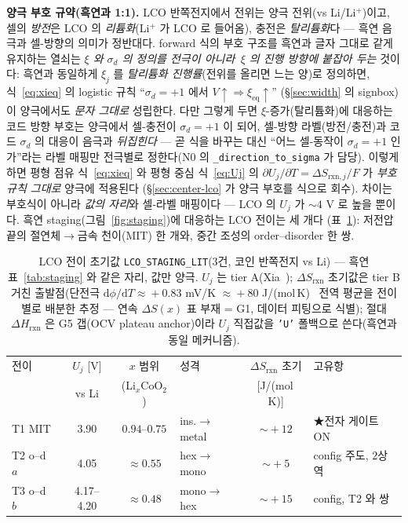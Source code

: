 \documentclass[11pt,a4paper]{article}
\newcommand{\dd}{\mathrm{d}}
\newcommand{\eq}{\mathrm{eq}}
\newcommand{\rxn}{\mathrm{rxn}}
\newcommand{\code}[1]{\texttt{#1}}
\begin{document}
\textbf{양극 부호 규약(흑연과 1:1).} LCO 반쪽전지에서 전위는 양극 전위(vs Li/Li$^+$)이고, 셀의 \emph{방전}은
LCO 의 \emph{리튬화}(Li$^+$ 가 LCO 로 들어옴), 충전은 \emph{탈리튬화}다 — 흑연 음극과 셀-방향의 의미가 정반대다.
forward 식의 부호 구조를 흑연과 글자 그대로 같게 유지하는 열쇠는 \emph{$\xi$ 와 $\sigma_d$ 의 정의를 전극이 아니라
\,$\xi$ 의 진행 방향에 붙잡아 두는} 것이다: 흑연과 동일하게 $\xi_j$ 를 \emph{탈리튬화 진행률}(전위를 올리면 느는 양)로
정의하면, 식~\eqref{eq:xieq} 의 logistic 규칙 ``$\sigma_d=+1$ 에서 $V\!\uparrow\Rightarrow\xi_\eq\!\uparrow$''
(\S\ref{sec:width} 의 signbox)이 양극에서도 \emph{문자 그대로} 성립한다. 다만 그렇게 두면 $\xi$-증가(탈리튬화)에
대응하는 코드 방향 부호는 양극에서 셀-충전이 $\sigma_d=+1$ 이 되어, 셀-방향 라벨(방전/충전)과 코드 $\sigma_d$ 의
대응이 음극과 \emph{뒤집힌다} — 곧 식을 바꾸는 대신 ``어느 셀-동작이 $\sigma_d=+1$ 인가''라는 라벨 매핑만 전극별로
정한다(N0 의 \code{\_direction\_to\_sigma} 가 담당). 이렇게 하면 평형 점유 식~\eqref{eq:xieq} 와 평형 중심
식~\eqref{eq:Uj} 의 $\partial U_j/\partial T=\Delta S_{\rxn,j}/F$ 가 \emph{부호 규칙 그대로} 양극에 적용된다
(\S\ref{sec:center-lco} 가 양극 부호를 식으로 회수). 차이는 부호식이 아니라 \emph{값의 자리}와 셀-라벨 매핑이다 —
LCO 의 $U_j$ 가 $\sim4$ V 로 높을 뿐이다. 흑연 staging(그림~\ref{fig:staging})에 대응하는 LCO 전이는 세 개다
(표~\ref{tab:lcostaging}): 저전압 끝의 절연체$\to$금속 천이(MIT) 한 개와, 중간 조성의 order--disorder 한 쌍.

\begin{table}[t]
\centering
\renewcommand{\arraystretch}{1.25}
\caption{LCO 전이 초기값 \code{LCO\_STAGING\_LIT}(3건, 코인 반쪽전지 vs Li) — 흑연 표~\ref{tab:staging} 와 같은 자리,
값만 양극. $U_j$ 는 tier A(Xia~\cite{xia2007}); $\Delta S_\rxn$ 초기값은 tier B 거친 출발점(단전극 $\dd\phi/\dd T\!\approx\!+0.83$ mV/K
$\approx\!+80$ J/(mol\,K)~\cite{swiderska2019} 전역 평균을 전이별로 배분한 추정 — 연속 $\Delta S(x)$ 표 부재 = G1, 데이터 피팅으로 식별);
절대 $\Delta H_\rxn$ 은 G5 갭(OCV plateau anchor)이라 $U_j$ 직접값을 \code{'U'} 폴백으로 쓴다(흑연과 동일 메커니즘).}
\label{tab:lcostaging}
\begin{tabular}{@{}l c c l c l@{}}
\toprule
전이 & $U_j$ [V] & $x$ 범위 & 성격 & $\Delta S_\rxn$ 초기 & 고유항 \\
 & vs Li & (Li$_x$CoO$_2$) & & [J/(mol\,K)] & \\
\midrule
T1 MIT            & 3.90        & $0.94$--$0.75$ & ins.$\to$metal & $\sim\!+12$ & ★전자 게이트 ON \\
T2 o--d $a$ & 4.05   & $\approx0.55$  & hex$\to$mono & $\sim\!+5$ & config 주도, 2상역 \\
T3 o--d $b$ & 4.17--4.20 & $\approx0.48$ & mono$\to$hex & $\sim\!+15$ & config, T2 와 쌍 \\
\bottomrule
\end{tabular}
\end{table}
\end{document}

